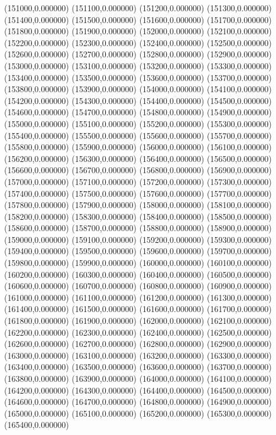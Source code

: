(151000,0.000000)
(151100,0.000000)
(151200,0.000000)
(151300,0.000000)
(151400,0.000000)
(151500,0.000000)
(151600,0.000000)
(151700,0.000000)
(151800,0.000000)
(151900,0.000000)
(152000,0.000000)
(152100,0.000000)
(152200,0.000000)
(152300,0.000000)
(152400,0.000000)
(152500,0.000000)
(152600,0.000000)
(152700,0.000000)
(152800,0.000000)
(152900,0.000000)
(153000,0.000000)
(153100,0.000000)
(153200,0.000000)
(153300,0.000000)
(153400,0.000000)
(153500,0.000000)
(153600,0.000000)
(153700,0.000000)
(153800,0.000000)
(153900,0.000000)
(154000,0.000000)
(154100,0.000000)
(154200,0.000000)
(154300,0.000000)
(154400,0.000000)
(154500,0.000000)
(154600,0.000000)
(154700,0.000000)
(154800,0.000000)
(154900,0.000000)
(155000,0.000000)
(155100,0.000000)
(155200,0.000000)
(155300,0.000000)
(155400,0.000000)
(155500,0.000000)
(155600,0.000000)
(155700,0.000000)
(155800,0.000000)
(155900,0.000000)
(156000,0.000000)
(156100,0.000000)
(156200,0.000000)
(156300,0.000000)
(156400,0.000000)
(156500,0.000000)
(156600,0.000000)
(156700,0.000000)
(156800,0.000000)
(156900,0.000000)
(157000,0.000000)
(157100,0.000000)
(157200,0.000000)
(157300,0.000000)
(157400,0.000000)
(157500,0.000000)
(157600,0.000000)
(157700,0.000000)
(157800,0.000000)
(157900,0.000000)
(158000,0.000000)
(158100,0.000000)
(158200,0.000000)
(158300,0.000000)
(158400,0.000000)
(158500,0.000000)
(158600,0.000000)
(158700,0.000000)
(158800,0.000000)
(158900,0.000000)
(159000,0.000000)
(159100,0.000000)
(159200,0.000000)
(159300,0.000000)
(159400,0.000000)
(159500,0.000000)
(159600,0.000000)
(159700,0.000000)
(159800,0.000000)
(159900,0.000000)
(160000,0.000000)
(160100,0.000000)
(160200,0.000000)
(160300,0.000000)
(160400,0.000000)
(160500,0.000000)
(160600,0.000000)
(160700,0.000000)
(160800,0.000000)
(160900,0.000000)
(161000,0.000000)
(161100,0.000000)
(161200,0.000000)
(161300,0.000000)
(161400,0.000000)
(161500,0.000000)
(161600,0.000000)
(161700,0.000000)
(161800,0.000000)
(161900,0.000000)
(162000,0.000000)
(162100,0.000000)
(162200,0.000000)
(162300,0.000000)
(162400,0.000000)
(162500,0.000000)
(162600,0.000000)
(162700,0.000000)
(162800,0.000000)
(162900,0.000000)
(163000,0.000000)
(163100,0.000000)
(163200,0.000000)
(163300,0.000000)
(163400,0.000000)
(163500,0.000000)
(163600,0.000000)
(163700,0.000000)
(163800,0.000000)
(163900,0.000000)
(164000,0.000000)
(164100,0.000000)
(164200,0.000000)
(164300,0.000000)
(164400,0.000000)
(164500,0.000000)
(164600,0.000000)
(164700,0.000000)
(164800,0.000000)
(164900,0.000000)
(165000,0.000000)
(165100,0.000000)
(165200,0.000000)
(165300,0.000000)
(165400,0.000000)
